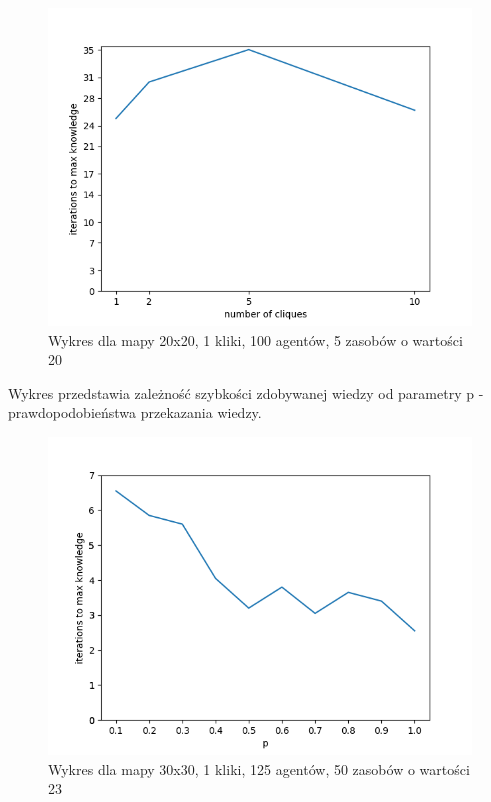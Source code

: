 \begin{figure}[H]
	\centering
	\includegraphics[width=130mm]{wykresy/different_number_of_cliques_map-20x20_graph-1-100_res-5-20_p-1.png}
	\caption{Wykres dla mapy 20x20, 1 kliki, 100 agentów, 5 zasobów o wartości 20}
\end{figure}

Wykres przedstawia zależność szybkości zdobywanej wiedzy od parametry p - prawdopodobieństwa przekazania wiedzy.
\nopagebreak

\begin{figure}[H]
	\centering
	\includegraphics[width=130mm]{wykresy/different_p_map-30x30_graph-1-125_res-50-23_p-1.png}
	\caption{Wykres dla mapy 30x30, 1 kliki, 125 agentów, 50 zasobów o wartości 23}
\end{figure}

